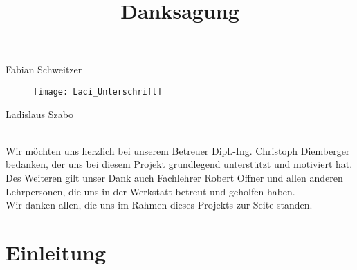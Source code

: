 \documentclass[11pt]{article}
\begin{document}
Fabian Schweitzer
\begin{figure}[h]
	\begin{center}
	\scalebox{0.5}
	{\texttt{[image: Laci\_Unterschrift]}}
	\end{center}
\end{figure}

Ladislaus Szabo

\pagebreak


\begin{center}

	\hfill \break
	\hfill \break
	\hfill \break
	\hfill \break
	\hfill \break
	\title{\textbf{\LARGE{Danksagung}}}	
	\maketitle

\end{center}

\hfill \break
\\
Wir möchten uns herzlich bei unserem Betreuer Dipl.-Ing. Christoph Diemberger bedanken, 
der uns bei diesem Projekt grundlegend unterstützt und motiviert hat. 
\hfill \break
\\
Des Weiteren gilt unser Dank auch Fachlehrer Robert Offner und allen anderen Lehrpersonen, 
die uns in der Werkstatt betreut und geholfen haben.
\hfill \break
\\
Wir danken allen, die uns im Rahmen dieses Projekts zur Seite standen.

\pagebreak


\tableofcontents

\section{Einleitung}
\end{document}
